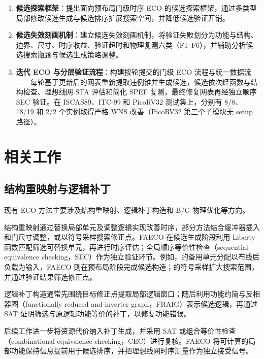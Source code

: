 \documentclass[twocolumn,10pt,fontset=windows]{ctexart}
\begin{document}
\begin{enumerate}
  \item \textbf{候选探索框架}：提出面向预布局门级时序 ECO 的候选探索框架，通过多类型局部修改候选生成与候选排序扩展搜索空间，并降低候选验证开销。
  \item \textbf{候选失效刻画机制}：建立候选失效刻画机制，将验证失败划分为功能与结构、边界、尺寸、时序收益、验证超时和物理复测六类（F1--F6），并辅助分析候选搜索瓶颈与候选生成策略调整。
  \item \textbf{迭代 ECO 与分层验证流程}：构建按轮提交的门级 ECO 流程与统一数据流——每轮基于更新后的网表重新提取违例锥并生成候选，候选依次经函数与结构检查、理想线网 STA 评估和简化 SPEF 复测，最终修复网表再经独立顺序 SEC 验证。在 ISCAS89、ITC-99 和 PicoRV32 测试集上，分别有 8/8、18/19 和 2/2 个实例取得严格 WNS 改善（PicoRV32 第三个子模块无 setup 路径）。
\end{enumerate}

\section{相关工作}

\subsection{结构重映射与逻辑补丁}
现有 ECO 方法主要涉及结构重映射、逻辑补丁构造和 B/G 物理优化等方向。

结构重映射通过替换局部单元及调整逻辑实现改善时序，部分方法结合缓冲器插入和门尺寸调整\cite{ho2010eco}，或以符号采样搜索修正点\cite{kravets2019symbolic}。FAECO 在候选生成阶段利用 Liberty 函数匹配筛选可替换单元，再进行时序评估；全局顺序等价性检查（sequential equivalence checking，SEC）作为独立验证环节。例如，\cite{ho2010eco}的备用单元分配以布线后负载为输入，FAECO 则在预布局阶段完成候选构造；\cite{kravets2019symbolic}的符号采样扩大搜索范围，并通过验证结果筛选修正点。

逻辑补丁构造通常先围绕目标修正点提取局部逻辑窗口；随后利用功能约简与反相器图（functionally reduced and-inverter graph，FRAIG）表示候选逻辑，再通过 SAT 证明筛选与原逻辑功能等价的补丁，以修复功能错误\cite{jiang2010fraig,jiang2016resource}。

后续工作进一步将资源代价纳入补丁生成，并采用 SAT 或组合等价性检查（combinational equivalence checking，CEC）进行复核\cite{jiang2016resource,zhong2024stp}。FAECO 将可计算的局部功能保持信息提前用于候选排序，并把理想线网时序测量作为独立接受信号。
\end{document}
